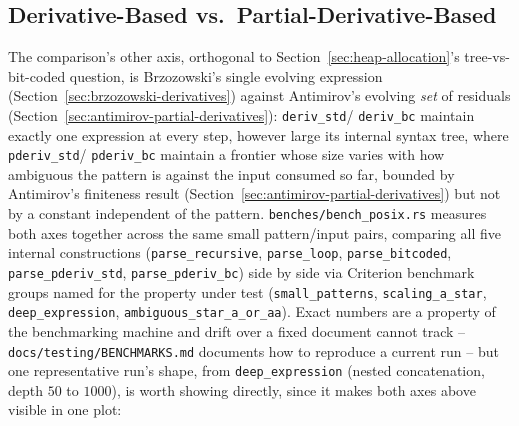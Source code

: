 \subsection{Derivative-Based vs.\ Partial-Derivative-Based}
\label{sec:deriv-vs-pderiv-performance}

The comparison's other axis, orthogonal to
Section~\ref{sec:heap-allocation}'s tree-vs-bit-coded question, is
Brzozowski's single evolving expression (Section~\ref{sec:brzozowski-derivatives})
against Antimirov's evolving \emph{set} of residuals
(Section~\ref{sec:antimirov-partial-derivatives}): \texttt{deriv\_std}/
\texttt{deriv\_bc} maintain exactly one expression at every step,
however large its internal syntax tree, where \texttt{pderiv\_std}/
\texttt{pderiv\_bc} maintain a frontier whose size varies with how
ambiguous the pattern is against the input consumed so far, bounded by
Antimirov's finiteness result (Section~\ref{sec:antimirov-partial-derivatives})
but not by a constant independent of the pattern. \texttt{benches/bench\_posix.rs}
measures both axes together across the same small pattern/input pairs,
comparing all five internal constructions (\texttt{parse\_recursive},
\texttt{parse\_loop}, \texttt{parse\_bitcoded}, \texttt{parse\_pderiv\_std},
\texttt{parse\_pderiv\_bc}) side by side via Criterion benchmark groups
named for the property under test (\texttt{small\_patterns},
\texttt{scaling\_a\_star}, \texttt{deep\_expression},
\texttt{ambiguous\_star\_a\_or\_aa}). Exact numbers are a property of the
benchmarking machine and drift over a fixed document cannot track --
\texttt{docs/testing/BENCHMARKS.md} documents how to reproduce a current
run -- but one representative run's shape, from \texttt{deep\_expression}
(nested concatenation, depth $50$ to $1000$), is worth showing directly,
since it makes both axes above visible in one plot:

\begin{center}
\end{center}

